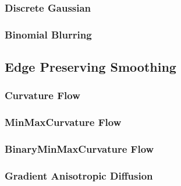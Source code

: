 \subsubsection{Discrete Gaussian}
\label{sec:DiscreteGaussianImageFilter}

%


\subsubsection{Binomial Blurring}
\label{sec:BinomialBlurImageFilter}

%



\subsection{Edge Preserving Smoothing}
\label{sec:EdgePreservingSmoothingFilters}


\subsubsection{Curvature Flow}
\label{sec:CurvatureFlowImageFilter}

%


\subsubsection{MinMaxCurvature Flow}
\label{sec:MinMaxCurvatureFlowImageFilter}

%



\subsubsection{BinaryMinMaxCurvature Flow}
\label{sec:BinaryMinMaxCurvatureFlowImageFilter}

%


\subsubsection{Gradient Anisotropic Diffusion}
\label{sec:GradientAnisotropicDiffusionImageFilter}

%



